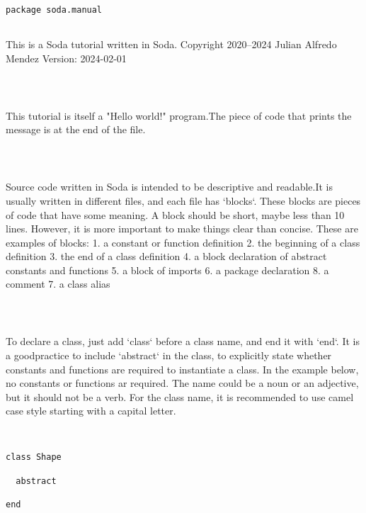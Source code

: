 \documentclass[12pt,a4paper]{article}
\begin{document}
\begin{lstlisting}
package soda.manual


\end{lstlisting}

This is a Soda tutorial written in Soda.
Copyright 2020--2024 Julian Alfredo Mendez
 Version: 2024-02-01


\begin{lstlisting}



\end{lstlisting}

This tutorial is itself a "Hello world!" program.The piece of code that prints the message is at the end of the file. 


\begin{lstlisting}



\end{lstlisting}

Source code written in Soda is intended to be descriptive and readable.It is usually written in different files, and each file has `blocks`.
These blocks are pieces of code that have some meaning.
A block should be short, maybe less than 10 lines.
However, it is more important to make things clear than concise.
These are examples of blocks:
1. a constant or function definition
2. the beginning of a class definition
3. the end of a class definition
4. a block declaration of abstract constants and functions
5. a block of imports
6. a package declaration
8. a comment 7. a class alias


\begin{lstlisting}



\end{lstlisting}

To declare a class, just add `class` before a class name, and end it with `end`. It is a goodpractice to include `abstract` in the class, to explicitly state whether constants and
functions are required to instantiate a class. In the example below, no constants or
functions ar required.
The name could be a noun or an adjective, but it should not be a verb. For the class name, it is recommended to use camel case style starting with a capital letter.


\begin{lstlisting}


class Shape

  abstract

end


\end{lstlisting}
\end{document}
